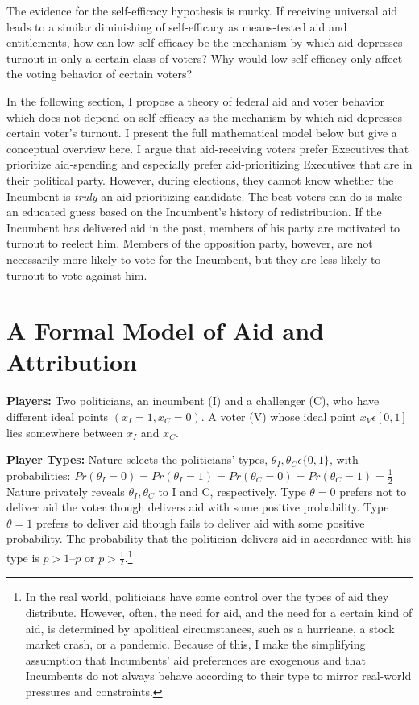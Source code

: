 \documentclass[12pt]{paper}
\begin{document}
The evidence for the self-efficacy hypothesis is murky. If receiving universal aid leads to a similar diminishing of self-efficacy as means-tested aid and entitlements, how can low self-efficacy be the mechanism by which aid depresses turnout in only a certain class of voters? Why would low self-efficacy only affect the voting behavior of certain voters?

In the following section, I propose a theory of federal aid and voter behavior which does not depend on self-efficacy as the mechanism by which aid depresses certain voter's turnout. I present the full mathematical model below but give a conceptual overview here. I argue that aid-receiving voters prefer Executives that prioritize aid-spending and especially prefer aid-prioritizing Executives that are in their political party. However, during elections, they cannot know whether the Incumbent is \textit{truly} an aid-prioritizing candidate. The best voters can do is make an educated guess based on the Incumbent's history of redistribution. If the Incumbent has delivered aid in the past, members of his party are motivated to turnout to reelect him. Members of the opposition party, however, are not necessarily more likely to vote for the Incumbent, but they are less likely to turnout to vote against him.

\section{A Formal Model of Aid and Attribution}
\textbf{Players:} Two politicians, an incumbent (I) and a challenger (C), who have different ideal points $(x_I=1, x_C=0)$. A voter (V) whose ideal point $x_V \epsilon [0,1]$ lies somewhere between $x_I$ and $x_C.$

\textbf{Player Types:} Nature selects the politicians’ types, $\theta_I, \theta_C \epsilon \{0,1\}$, with probabilities: $Pr(\theta_I=0)=Pr(\theta_I=1)=Pr(\theta_C=0)=Pr(\theta_C=1)= \frac{1}{2}$ Nature privately reveals $\theta_I,\theta_C$ to I and C, respectively. Type $\theta=0$ prefers not to deliver aid the voter though delivers aid with some positive probability. Type $\theta=1$ prefers to deliver aid though fails to deliver aid with some positive probability. The probability that the politician delivers aid in accordance with his type is $p > 1 – p$ or $p > \frac{1}{2}$.\footnote{In the real world, politicians have some control over the types of aid they distribute. However, often, the need for aid, and the need for a certain kind of aid, is determined by apolitical circumstances, such as a hurricane, a stock market crash, or a pandemic. Because of this, I make the simplifying assumption that Incumbents' aid preferences are exogenous and that Incumbents do not always behave according to their type to mirror real-world pressures and constraints.}
\end{document}
